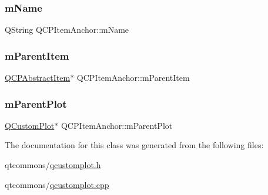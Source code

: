 \subsubsection{\texorpdfstring{mName}{mName}}
{\footnotesize\ttfamily Q\+String Q\+C\+P\+Item\+Anchor\+::m\+Name\hspace{0.3cm}{\ttfamily [protected]}}

\mbox{\label{class_q_c_p_item_anchor_a80fad480ad3bb980446ed6ebc00818ae}} 
\subsubsection{\texorpdfstring{mParentItem}{mParentItem}}
{\footnotesize\ttfamily \mbox{\hyperlink{class_q_c_p_abstract_item}{Q\+C\+P\+Abstract\+Item}}$\ast$ Q\+C\+P\+Item\+Anchor\+::m\+Parent\+Item\hspace{0.3cm}{\ttfamily [protected]}}

\mbox{\label{class_q_c_p_item_anchor_a59b968410831ba91a25cc75a77dde6f5}} 
\subsubsection{\texorpdfstring{mParentPlot}{mParentPlot}}
{\footnotesize\ttfamily \mbox{\hyperlink{class_q_custom_plot}{Q\+Custom\+Plot}}$\ast$ Q\+C\+P\+Item\+Anchor\+::m\+Parent\+Plot\hspace{0.3cm}{\ttfamily [protected]}}



The documentation for this class was generated from the following files\+:\begin{DoxyCompactItemize}
\item 
qtcommons/\mbox{\hyperlink{qcustomplot_8h}{qcustomplot.\+h}}\item 
qtcommons/\mbox{\hyperlink{qcustomplot_8cpp}{qcustomplot.\+cpp}}\end{DoxyCompactItemize}
